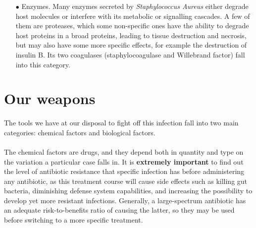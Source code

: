 \begin{itemize}
\item[$\bullet$] Enzymes. Many enzymes secreted by \emph{Staphylococcus Aureus} either degrade host molecules or interfere with its metabolic or signalling cascades. A few of them are proteases, which some non-specific ones have the ability to degrade host proteins in a broad proteins, leading to tissue destruction and necrosis, but may also have some more specific effects, for example the destruction of insulin B. Its two coagulases (staphylocoagulase and Willebrand factor) fall into this category.
\end{itemize}
\section{Our weapons}
\paragraph{} The tools we have at our disposal to fight off this infection fall into two main categories: chemical factors and biological factors.
\paragraph{} The chemical factors are drugs, and they depend both in quantity and type on the variation a particular case falls in. It is \textbf{extremely important} to find out the level of antibiotic resistance that specific infection has before administering any antibiotic, as this treatment course will cause side effects such as killing gut bacteria, diminishing defense system capabilities, and increasing the possibility to develop yet more resistant infections. Generally, a large-spectrum antibiotic has an adequate risk-to-benefits ratio of causing the latter, so they may be used before switching to a more specific treatment.
